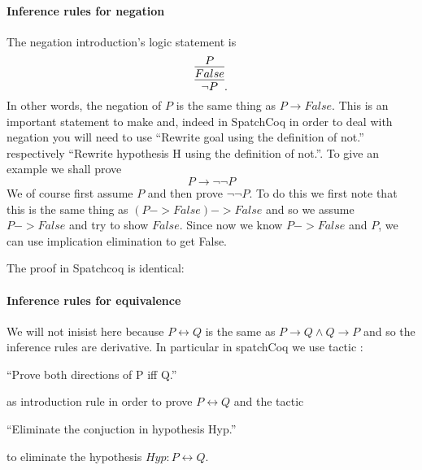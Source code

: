 \begin{itemize}
\paragraph{Inference rules for negation}
The negation introduction's logic statement is
$$\infer{\neg P}{\infer{False}{P}}.$$
In other words, the negation of $P$ is the same thing as $P\rightarrow False$. This is an important statement to make and, indeed in SpatchCoq in order to deal with negation you will need to use ``Rewrite goal using the definition of not.'' respectively ``Rewrite hypothesis	H using the definition of not.''. To give an example we shall prove 
$$P \rightarrow \neg \neg P$$
We of course first assume $P$ and then prove $\neg \neg P$. To do this we first note that this is the same thing as $(P->False)->False$ and so we assume $P->False$ and try to show $False$. Since now we know $P->False$ and $P$, we can use implication elimination to get False.




The proof in Spatchcoq is identical:


\end{itemize}

\paragraph{Inference rules for equivalence}

We will not inisist here because $P\leftrightarrow Q$ is the same as $P\rightarrow Q \land Q\rightarrow P$ and so the inference rules are derivative. In particular
 in spatchCoq we use  tactic :
 
``Prove both directions of P iff Q.''  

as introduction rule in order to prove $P\leftrightarrow Q$ and the  tactic 


``Eliminate the conjuction in hypothesis Hyp.'' 


to eliminate the hypothesis $Hyp: P\leftrightarrow Q$.



 





